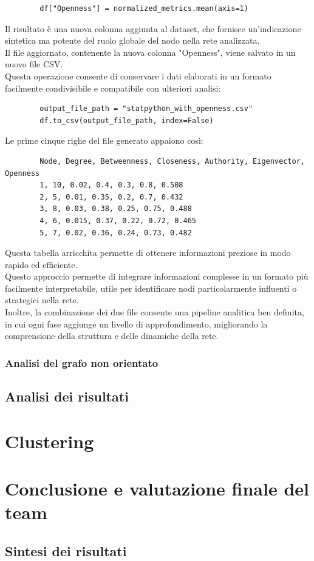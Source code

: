 \documentclass[12pt]{article}
\begin{document}
	\begin{lstlisting}
		df["Openness"] = normalized_metrics.mean(axis=1)
	\end{lstlisting}
	Il risultato è una nuova colonna aggiunta al dataset, che fornisce un'indicazione sintetica ma potente del ruolo globale del nodo nella rete analizzata.\\
	Il file aggiornato, contenente la nuova colonna "Openness", viene salvato in un nuovo file CSV. \\Questa operazione consente di conservare i dati elaborati in un formato facilmente condivisibile e compatibile con ulteriori analisi:
	\begin{lstlisting}
		output_file_path = "statpython_with_openness.csv"
		df.to_csv(output_file_path, index=False)
	\end{lstlisting}
	Le prime cinque righe del file generato appaiono così:
	\begin{lstlisting}
		Node, Degree, Betweenness, Closeness, Authority, Eigenvector, Openness
		1, 10, 0.02, 0.4, 0.3, 0.8, 0.508
		2, 5, 0.01, 0.35, 0.2, 0.7, 0.432
		3, 8, 0.03, 0.38, 0.25, 0.75, 0.488
		4, 6, 0.015, 0.37, 0.22, 0.72, 0.465
		5, 7, 0.02, 0.36, 0.24, 0.73, 0.482
	\end{lstlisting}
	Questa tabella arricchita permette di ottenere informazioni preziose in modo rapido ed efficiente.\\
	Questo approccio permette di integrare informazioni complesse in un formato più facilmente interpretabile, utile per identificare nodi particolarmente influenti o strategici nella rete. \\Inoltre, la combinazione dei due file consente una pipeline analitica ben definita, in cui ogni fase aggiunge un livello di approfondimento, migliorando la comprensione della struttura e delle dinamiche della rete.
	\subsubsection{Analisi del grafo non orientato}
	\subsection{Analisi dei risultati}
	\section{Clustering}
	\section{Conclusione e valutazione finale del team}
	\subsection{Sintesi dei risultati}
	
	
\end{document}
